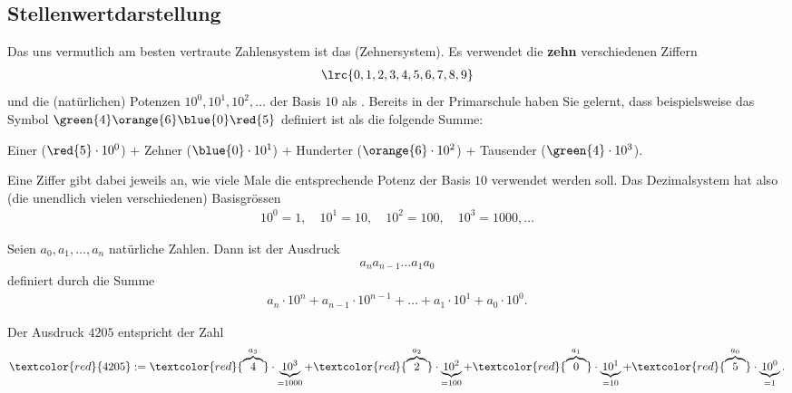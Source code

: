 \subsection{Stellenwertdarstellung}
\label{subsec:stellenwertdarst}
Das uns vermutlich am besten vertraute Zahlensystem ist das 
(Zehnersystem). Es verwendet die \textbf{zehn} verschiedenen Ziffern
\begin{align*}
  \lrc{0,1,2,3,4,5,6,7,8,9}
\end{align*}
und die (natürlichen) Potenzen $10^0, 10^1, 10^2, \ldots$ der Basis $10$ als .
Bereits in der Primarschule haben Sie gelernt, dass beispielsweise das Symbol $\green{4}\orange{6}\blue{0}\red{5}$ definiert ist als die folgende
Summe:
\begin{center}
   Einer ($\red{5}\cdot 10^0$) $+$  Zehner ($\blue{0}\cdot 10^1$) $+$  Hunderter
  ($\orange{6}\cdot 10^2$) +  Tausender
  ($\green{4}\cdot 10^3$). 
\end{center}
Eine Ziffer gibt dabei jeweils an, wie viele Male die entsprechende Potenz der Basis $10$ verwendet werden soll. Das
Dezimalsystem hat also (die unendlich vielen verschiedenen) Basisgrössen
\begin{align*}
  10^0=1,\quad 10^1=10,\quad 10^2=100,\quad 10^3=1000,\ldots
\end{align*}

\begin{mydefinition}\label{mydefinition:Stellenwertdarstellung}
  Seien $a_0, a_1, \ldots, a_n$ natürliche Zahlen. Dann ist der Ausdruck
  \begin{align*}
    a_na_{n-1}\ldots a_1a_0
  \end{align*}
  definiert durch die Summe
  \begin{align*}
    a_n\cdot 10^n + a_{n-1}\cdot 10^{n-1}+\ldots + a_1\cdot 10^1 + a_0\cdot 10^0.
  \end{align*}
\end{mydefinition}

\begin{myexample}
  Der Ausdruck $4205$ entspricht der Zahl
  \begin{align*}
    \textcolor{red}{4205} := \textcolor{red}{\overbrace{4}^{a_3}}\cdot \underbrace{10^3}_{=1000} + \textcolor{red}{\overbrace{2}^{a_2}}\cdot \underbrace{10^2}_{=100} + \textcolor{red}{\overbrace{0}^{a_1}}\cdot \underbrace{10^1}_{=10} + \textcolor{red}{\overbrace{5}^{a_0}}\cdot \underbrace{10^0}_{=1}.
\end{align*}
\end{myexample}

